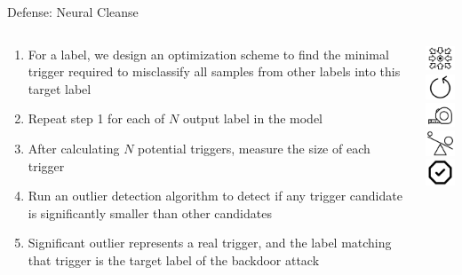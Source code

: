 \documentclass[pdf]{beamer}
\begin{document}
\begin{frame}[fragile]{Defense: Neural Cleanse}
\begin{minipage}[0.2\textheight]{\textwidth}
\begin{columns}[T]
\begin{column}{0.7\textwidth}
\begin{enumerate}
\item For a label, we design an optimization scheme to find the minimal trigger required to misclassify all samples from other labels into this target label
\item Repeat step 1 for each of $N$ output label in the model
\item After calculating $N$ potential triggers, measure the size of each trigger
\item Run an outlier detection algorithm to detect if any trigger candidate is significantly smaller than other candidates
\item Significant outlier represents a real trigger, and the label matching that trigger is the target label of the backdoor attack
\end{enumerate}
\end{column}
\begin{column}{0.2\textwidth}
\includegraphics[width=1.8cm]{Images/1.png}
\\
\includegraphics[width=1.8cm]{Images/2.png}
\\
\includegraphics[width=1.8cm]{Images/3.png}
\\
\includegraphics[width=1.8cm]{Images/4.png}
\\
\includegraphics[width=1.8cm]{Images/5.png}
\end{column}
\end{columns}
\end{minipage}
\end{frame}
\end{document}
